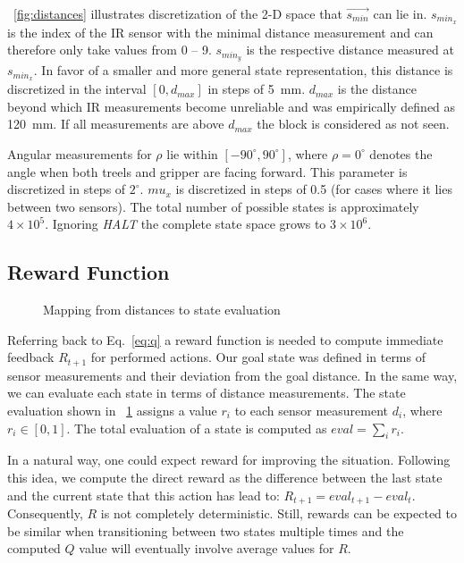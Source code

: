 \figurename~\ref{fig:distances} illustrates discretization of the 2-D space that $\vec{s_{min}}$ can lie in. $s_{min_x}$ is the index of the IR sensor with the minimal distance measurement and can therefore only take values from 0 -- 9. $s_{min_y}$ is the respective distance measured at$s_{min_x}$. In favor of a smaller and more general state representation, this distance is discretized in the interval $[0,d_{max}]$ in steps of 5~mm. $d_{max}$ is the distance beyond which IR measurements become unreliable and was empirically defined as 120~mm. If all measurements are above $d_{max}$ the block is considered as not seen.

Angular measurements for $\rho$ lie within $\left[-90^\circ,90^\circ\right]$, where $\rho = 0^\circ$ denotes the angle when both treels and gripper are facing forward. This parameter is discretized in steps of $2^\circ$. $mu_x$ is discretized in steps of 0.5 (for cases where it lies between two sensors). The total number of possible states is approximately $4\times10^5$. Ignoring \textit{HALT} the complete state space grows to $3\times10^6$.

\subsection{Reward Function}
\begin{figure}
    \centering
    \def\svgwidth{0.5 \textwidth}
    
    \caption{Mapping from distances to state evaluation}
    \label{fig:reward}
\end{figure}

Referring back to Eq.~\eqref{eq:q} a reward function is needed to compute immediate feedback $R_{t+1}$ for performed actions. Our goal state was defined in terms of sensor measurements and their deviation from the goal distance. In the same way, we can evaluate each state in terms of distance measurements. The state evaluation shown in \figurename~\ref{fig:reward} assigns a value $r_i$ to each sensor measurement $d_i$, where $r_i \in [0,1]$. The total evaluation of a state is computed as $eval = \sum_{i} r_i$.

In a natural way, one could expect reward for improving the situation. Following this idea, we compute the direct reward as the difference between the last state and the current state that this action has lead to: $R_{t+1} = eval_{t+1} - eval_{t}$. Consequently, $R$ is not completely deterministic. Still, rewards can be expected to be similar when transitioning between two states multiple times and the computed $Q$ value will eventually involve average values for $R$.

